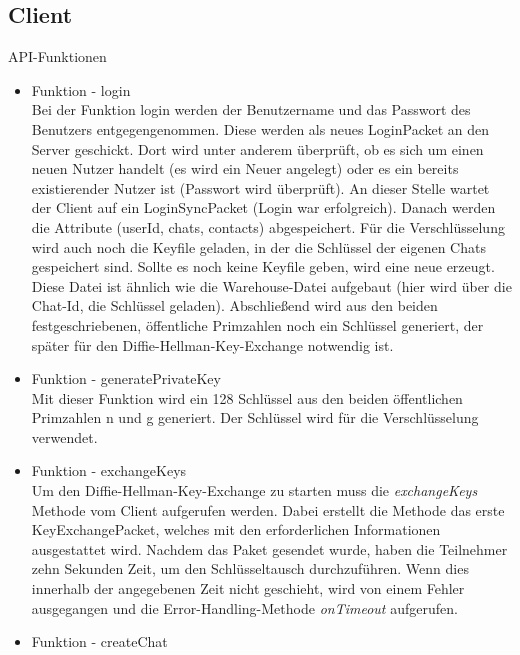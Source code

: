 \subsection{Client}
API-Funktionen
\begin{itemize}
    \item Funktion - login\\
    Bei der Funktion login werden der Benutzername und das Passwort des Benutzers entgegengenommen. Diese werden als neues LoginPacket an den Server geschickt. Dort wird unter anderem überprüft, ob es sich um einen neuen Nutzer handelt (es wird ein Neuer angelegt) oder es ein bereits existierender Nutzer ist (Passwort wird überprüft). An dieser Stelle wartet der Client auf ein LoginSyncPacket (Login war erfolgreich). Danach werden die Attribute (userId, chats, contacts) abgespeichert. Für die Verschlüsselung wird auch noch die Keyfile geladen, in der die Schlüssel der eigenen Chats gespeichert sind. Sollte es noch keine Keyfile geben, wird eine neue erzeugt. Diese Datei ist ähnlich wie die Warehouse-Datei aufgebaut (hier wird über die Chat-Id, die Schlüssel geladen). Abschließend wird aus den beiden festgeschriebenen, öffentliche Primzahlen noch ein Schlüssel generiert, der später für den Diffie-Hellman-Key-Exchange notwendig ist.
    
    \item Funktion - generatePrivateKey\\
    Mit dieser Funktion wird ein 128 Schlüssel aus den beiden öffentlichen Primzahlen n und g generiert. Der Schlüssel wird für die Verschlüsselung verwendet.
    
    \item Funktion - exchangeKeys\\
    Um den Diffie-Hellman-Key-Exchange zu starten muss die \textit{exchangeKeys} Methode vom Client aufgerufen werden.
    Dabei erstellt die Methode das erste KeyExchangePacket, welches mit den erforderlichen Informationen
    ausgestattet wird. Nachdem das Paket gesendet wurde, haben die Teilnehmer zehn Sekunden Zeit, um den Schlüsseltausch durchzuführen.
    Wenn dies innerhalb der angegebenen Zeit nicht geschieht, wird von einem Fehler ausgegangen und die Error-Handling-Methode \textit{onTimeout} aufgerufen.
    
    \item Funktion - createChat\\

\end{itemize}
